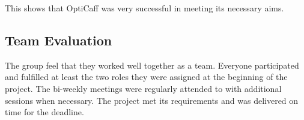 This shows that OptiCaff was very successful in meeting its necessary aims.

\subsection{Team Evaluation}
The group feel that they worked well together as a team. Everyone participated and fulfilled at least the two roles they were assigned at the beginning of the project. The bi-weekly meetings were regularly attended to with additional sessions when necessary. The project met its requirements and was delivered on time for the deadline. 
